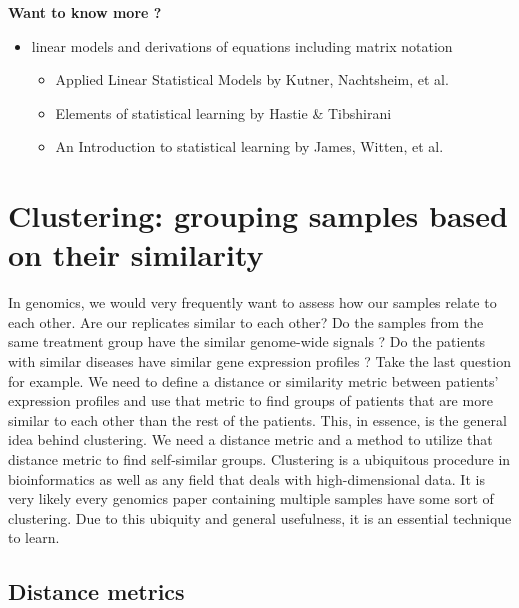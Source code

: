 \documentclass[12pt,]{krantz}
\providecommand{\tightlist}{%
  \setlength{\itemsep}{0pt}\setlength{\parskip}{0pt}}
\theoremstyle{definition}
\theoremstyle{definition}
\theoremstyle{definition}
\theoremstyle{remark}
\let\BeginKnitrBlock\begin \let\EndKnitrBlock\end
\begin{document}
\BeginKnitrBlock{rmdtip}
\textbf{Want to know more ?}

\begin{itemize}
\tightlist
\item
  linear models and derivations of equations including matrix notation

  \begin{itemize}
  \tightlist
  \item
    Applied Linear Statistical Models by Kutner, Nachtsheim, et al.
  \item
    Elements of statistical learning by Hastie \& Tibshirani
  \item
    An Introduction to statistical learning by James, Witten, et al.
  \end{itemize}
\end{itemize}
\EndKnitrBlock{rmdtip}

\hypertarget{clustering-grouping-samples-based-on-their-similarity}{%
\section{Clustering: grouping samples based on their
similarity}\label{clustering-grouping-samples-based-on-their-similarity}}

In genomics, we would very frequently want to assess how our samples
relate to each other. Are our replicates similar to each other? Do the
samples from the same treatment group have the similar genome-wide
signals ? Do the patients with similar diseases have similar gene
expression profiles ? Take the last question for example. We need to
define a distance or similarity metric between patients' expression
profiles and use that metric to find groups of patients that are more
similar to each other than the rest of the patients. This, in essence,
is the general idea behind clustering. We need a distance metric and a
method to utilize that distance metric to find self-similar groups.
Clustering is a ubiquitous procedure in bioinformatics as well as any
field that deals with high-dimensional data. It is very likely every
genomics paper containing multiple samples have some sort of clustering.
Due to this ubiquity and general usefulness, it is an essential
technique to learn.

\hypertarget{distance-metrics}{%
\subsection{Distance metrics}\label{distance-metrics}}
\end{document}
